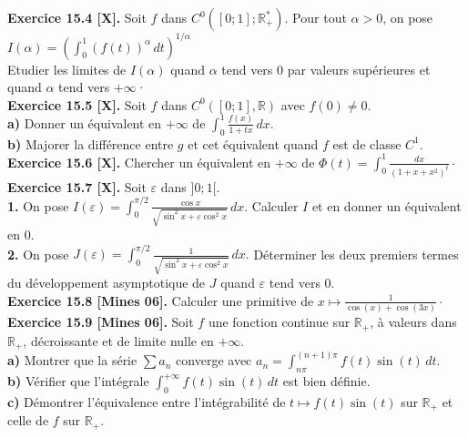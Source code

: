\documentclass[a4paper,12pt,francais]{article}
\newcommand{\field}[1]{\mathbb{#1}}
\newcommand{\R}{\field{R}}
\begin{document}
\noindent
{\bf Exercice 15.4 [X].} Soit $f$ dans $C^0([0;1];\R_+^*)$. Pour
tout $\alpha>0$, on pose
$\displaystyle I(\alpha)={
\left({ \int_0^1 (f(t))^\alpha \, dt }\right)
}^{1/\alpha}$\\
Etudier les limites de $I(\alpha)$ quand $\alpha$ tend vers $0$ par
valeurs supérieures et quand $\alpha$ tend vers $+\infty$·\\

\noindent
{\bf Exercice 15.5 [X].} Soit $f$ dans $C^0([0;1],\R)$ avec $f(0)\neq
0$.\\
{\bf a)} Donner un équivalent en $+\infty$ de $\displaystyle \int_0^1
\frac{f(x)}{1+tx} \, dx$.\\
{\bf b)} Majorer la différence entre $g$ et cet équivalent quand $f$
est de classe $C^1$.\\

\noindent
{\bf Exercice 15.6 [X].} Chercher un équivalent en $+\infty$ de
$\displaystyle \Phi(t)=\int_0^1 \frac{dx}{(1+x+x^2)^t} \cdot$\\

\noindent
{\bf Exercice 15.7 [X].} Soit $\varepsilon$ dans $]0;1[$.\\
{\bf 1.} On pose $\displaystyle I(\varepsilon)=\int_0^{\pi/2}
\frac{\cos x}{\sqrt{\sin^2x+\varepsilon \cos^2 x}} \, dx.$ Calculer
$I$ et en donner un équivalent en $0$.\\
{\bf 2.} On pose  $\displaystyle J(\varepsilon)=\int_0^{\pi/2}
\frac{1}{\sqrt{\sin^2x+\varepsilon \cos^2 x}} \, dx.$ Déterminer les
deux premiers termes du développement asymptotique de $J$ quand
$\varepsilon$ tend vers  $0$.\\

\noindent
{\bf Exercice 15.8 [Mines 06].} Calculer une primitive de
$\displaystyle  x \mapsto
\frac{1}{\cos(x)+\cos(3x)}\cdot$\\

\noindent
{\bf Exercice 15.9 [Mines 06].} Soit $f$ une fonction continue sur
$\R_+$, à valeurs dans $\R_+$, décroissante et de limite nulle en
$+\infty$.\\
\indent
{\bf a)} Montrer que la série $\sum a_n$ converge avec $\displaystyle
a_n=\int_{n\pi}^{(n+1)\pi} f(t) \sin(t) \, dt$.\\
\indent
{\bf b)} Vérifier que l'intégrale $\displaystyle \int_0^{+\infty}
f(t)\sin(t)\, dt$ est bien définie.\\
\indent
{\bf c)} Démontrer l'équivalence entre l'intégrabilité de $t\mapsto 
f(t)\sin(t)$ sur $\R_+$ et celle de $f$ sur $\R_+$.\\
\end{document}
